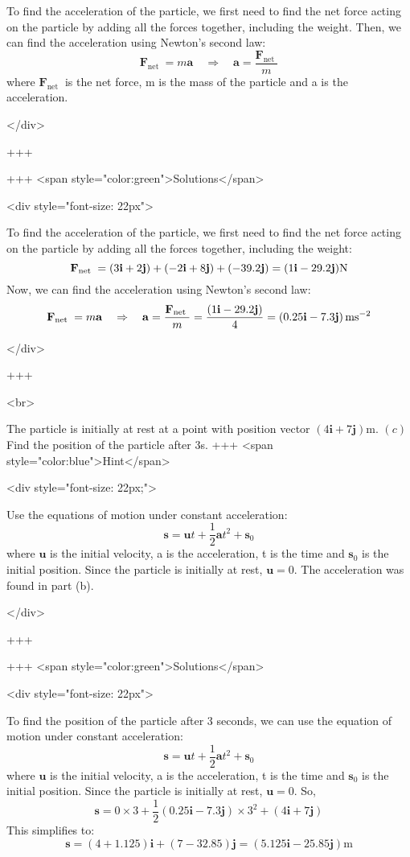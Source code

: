 To find the acceleration of the particle, we first need to find the net force acting on the particle by adding all the forces together, including the weight.
Then, we can find the acceleration using Newton's second law:
\[\mathbf{F}_{\text {net }}=m \mathbf{a} \quad \Rightarrow \quad \mathbf{a}=\frac{\mathbf{F}_{\text {net }}}{m}\]
where $\mathbf{F}_{\text {net }}$ is the net force, m is the mass of the particle and a is the acceleration.

</div>

+++

+++ <span style="color:green">Solutions</span>

<div style="font-size: 22px">

To find the acceleration of the particle, we first need to find the net force acting on the particle by adding all the forces together, including the weight:
\[\mathbf{F}_{\text {net }}=(3 \mathbf{i}+2 \mathbf{j})+(-2 \mathbf{i}+8 \mathbf{j})+(-39.2 \mathbf{j})=(1 \mathbf{i}-29.2 \mathbf{j}) \space \mathrm{N}\]
Now, we can find the acceleration using Newton's second law:
\[\mathbf{F}_{\text {net }}=m \mathbf{a} \quad \Rightarrow \quad \mathbf{a}=\frac{\mathbf{F}_{\text {net }}}{m}=\frac{(1 \mathbf{i}-29.2 \mathbf{j})}{4}=\left(0.25 \mathbf{i}-7.3 \mathbf{j}\right) \space \mathrm{ms}^{-2}\]


</div>

+++

<br>

The particle is initially at rest at a point with position vector $(4 \mathbf{i}+7 \mathbf{j}) \mathrm{m}$.
\((c)\) Find the position of the particle after 3s.
+++ <span style="color:blue">Hint</span>

<div style="font-size: 22px;">

Use the equations of motion under constant acceleration:
$$\mathbf{s}=\mathbf{u} t+\frac{1}{2} \mathbf{a} t^{2}+\mathbf{s}_{0}$$
where $\mathbf{u}$ is the initial velocity, a is the acceleration, t is the time and $\mathbf{s}_{0}$ is the initial position. Since the particle is initially at rest, $\mathbf{u}=0$.
The acceleration was found in part (b).

</div>

+++

+++ <span style="color:green">Solutions</span>

<div style="font-size: 22px">

To find the position of the particle after 3 seconds, we can use the equation of motion under constant acceleration:
$$\mathbf{s}=\mathbf{u} t+\frac{1}{2} \mathbf{a} t^{2}+\mathbf{s}_{0}$$
where $\mathbf{u}$ is the initial velocity, a is the acceleration, t is the time and $\mathbf{s}_{0}$ is the initial position. Since the particle is initially at rest, $\mathbf{u}=0$.
So,
\[\mathbf{s}=0 \times 3+\frac{1}{2}\left(0.25 \mathbf{i}-7.3 \mathbf{j}\right) \times 3^{2}+(4 \mathbf{i}+7 \mathbf{j})\]
This simplifies to:
\[\mathbf{s}=\left(4+1.125\right) \mathbf{i}+\left(7-32.85\right) \mathbf{j}=\left(5.125 \mathbf{i}-25.85 \mathbf{j}\right) \mathrm{m}\]


